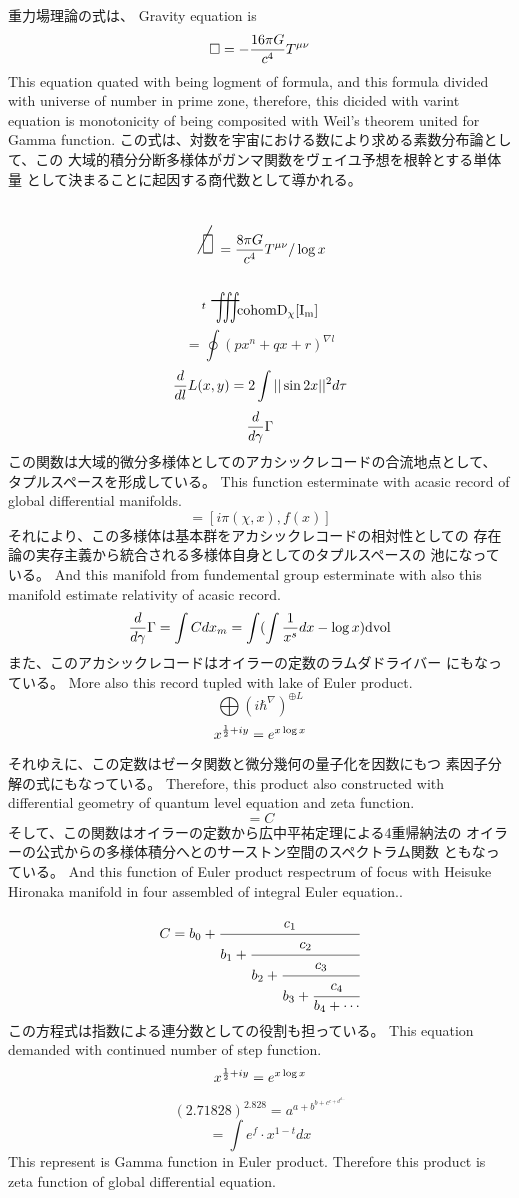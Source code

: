 \documentclass{jsarticle}
\begin{document}
 重力場理論の式は、
  Gravity equation is
  $$ \square = - {16 \pi G \over c^4}T^{\mu\nu} $$
  This equation quated with being logment of formula, and
  this formula divided with universe of number in prime zone,
  therefore, this dicided with varint equation is monotonicity of
  being composited with Weil's theorem united for Gamma function.
  この式は、対数を宇宙における数により求める素数分布論として、この
  大域的積分分断多様体がガンマ関数をヴェイユ予想を根幹とする単体量
  として決まることに起因する商代数として導かれる。
  $$ \scalebox{1}[2]{\alearletter} = 
  {{{{8 \pi G} \over {c^4}}T^{\mu\nu}}/ \log x} $$
  $$ {}^{t}\scalebox{1}[2]{\variiint}\mathrm{cohom D_{\chi}[I_m]}$$
  $$ = \oint {(px^n + qx + r)^{\nabla l}} $$
  $$ {d \over d l}L(x,y) = 2 \int ||\sin 2x||^{2}d \tau $$
  $$ {d \over d \gamma}\Gamma $$
  この関数は大域的微分多様体としてのアカシックレコードの合流地点として、
  タプルスペースを形成している。
  This function esterminate with acasic record of global differential
  manifolds.
  $$ = [i \pi (\chi, x), f(x)] $$
  それにより、この多様体は基本群をアカシックレコードの相対性としての
  存在論の実存主義から統合される多様体自身としてのタプルスペースの
  池になっている。
  And this manifold from fundemental group esterminate with
  also this manifold estimate relativity of acasic record.
  $$ {d \over d \gamma}\Gamma = \int C dx_m = \int(\int {1 \over x^s}dx
  - \log x)\mathrm{dvol} $$
  また、このアカシックレコードはオイラーの定数のラムダドライバー
  にもなっている。
  More also this record tupled with lake of Euler product.
  $$ \bigoplus({i \hbar^{\nabla}})^{\oplus L} $$
  $$ x^{{1 \over 2} + iy} = e^{x \log x} $$
  それゆえに、この定数はゼータ関数と微分幾何の量子化を因数にもつ
  素因子分解の式にもなっている。
  Therefore, this product also constructed with differential geometry
  of quantum level equation and zeta function.
  $$ = C $$ 
  そして、この関数はオイラーの定数から広中平祐定理による4重帰納法の
  オイラーの公式からの多様体積分へとのサーストン空間のスペクトラム関数
  ともなっている。
  And this function of Euler product respectrum of focus with
  Heisuke Hironaka manifold in four assembled of integral Euler equation.. 

  $$ C =  b_0 + \cfrac{c_1}{b_1 +
	  \cfrac{c_2}{b_2 +
	  \cfrac{c_3}{b_3 +
	  \cfrac{c_4}{b_4 + \cdots}}}} $$
  この方程式は指数による連分数としての役割も担っている。  
  This equation demanded with continued number of step function.
  $$ x^{{1 \over 2} + iy} = e^{x \log x} $$
  $$ (2.71828)^{2.828} = a^{a + b^{b + c^{c + d^{d \cdots }}}} $$
  $$ = \int e^f \cdot x^{1 - t}dx $$
  This represent is Gamma function in Euler product.
  Therefore this product is zeta function of global differential equation.
\end{document}
